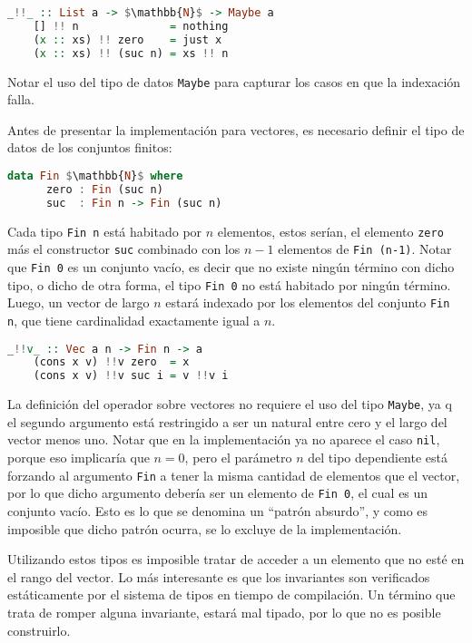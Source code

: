 \begin{lstlisting}[mathescape, language=Haskell]
	_!!_ :: List a -> $\mathbb{N}$ -> Maybe a
	[] !! n              = nothing
	(x :: xs) !! zero    = just x
	(x :: xs) !! (suc n) = xs !! n
\end{lstlisting}

Notar el uso del tipo de datos \verb|Maybe| para capturar los casos en que la indexación falla.

Antes de presentar la implementación para vectores, es necesario definir el tipo de datos de los conjuntos finitos:

\begin{lstlisting}[mathescape, language=Haskell]
	data Fin $\mathbb{N}$ where
	  zero : Fin (suc n)
	  suc  : Fin n -> Fin (suc n)
\end{lstlisting}

Cada tipo \verb|Fin n| está habitado por $n$ elementos, estos serían, el elemento \verb|zero| más el constructor \verb|suc| combinado con los $n-1$ elementos de \verb|Fin (n-1)|.
Notar que \verb|Fin 0| es un conjunto vacío, es decir que no existe ningún término con dicho tipo, o dicho de otra forma, el tipo \verb|Fin 0| no está habitado por ningún término.
Luego, un vector de largo $n$ estará indexado por los elementos del conjunto \verb|Fin n|, que tiene cardinalidad exactamente igual a $n$.

\begin{lstlisting}[mathescape, language=Haskell]
	_!!v_ :: Vec a n -> Fin n -> a
	(cons x v) !!v zero  = x
	(cons x v) !!v suc i = v !!v i
\end{lstlisting}

La definición del operador sobre vectores no requiere el uso del tipo \verb|Maybe|, ya q el segundo argumento está restringido a ser un natural entre cero y el largo del vector menos uno.
Notar que en la implementación ya no aparece el caso \verb|nil|, porque eso implicaría que $n = 0$, pero el parámetro $n$ del tipo dependiente está forzando al argumento \verb|Fin| a tener la misma cantidad de elementos que el vector, por lo que dicho argumento debería ser un elemento de \verb|Fin 0|, el cual es un conjunto vacío.
Esto es lo que se denomina un ``patrón absurdo'', y como es imposible que dicho patrón ocurra, se lo excluye de la implementación.

Utilizando estos tipos es imposible tratar de acceder a un elemento que no esté en el rango del vector.
Lo más interesante es que los invariantes son verificados estáticamente por el sistema de tipos en tiempo de compilación.
Un término que trata de romper alguna invariante, estará mal tipado, por lo que no es posible construirlo.


